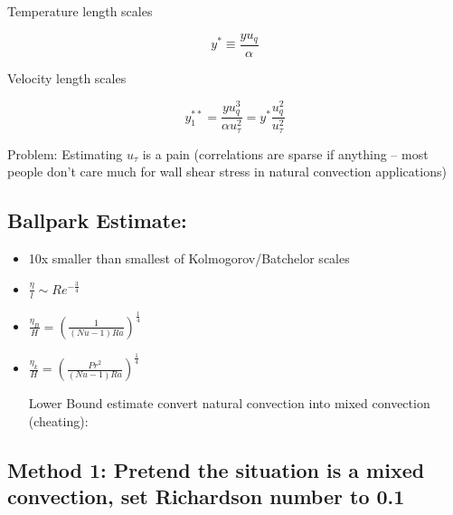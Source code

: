 \documentclass[12pt]{article}
\renewcommand{\_}{\kern-1.5pt\textunderscore\kern-1.5pt}
\begin{document}
Temperature length scales\par

 \[ y^{\ast} \equiv \frac{yu_{q}}{ \alpha } \] \par

Velocity length scales\par

 \[ y_{1}^{\ast\ast}=\frac{yu_{q}^{3}}{ \alpha u_{ \tau}^{2}}=y^{\ast}\frac{u_{q}^{2}}{u_{ \tau}^{2}} \] \par

Problem: Estimating  \( u_{ \tau} \)  is a pain (correlations are sparse if anything – most people don’t care much for wall shear stress in natural convection applications)\par


\vspace{\baselineskip}
\subsection{Ballpark Estimate:}\par

\begin{itemize}
	\item 10x smaller than smallest of Kolmogorov/Batchelor scales\par

	\item  \( \frac{ \eta }{l} \sim Re^{-\frac{3}{4}} \) \par

	\item  \( \frac{ \eta _{B}}{H}= \left( \frac{1}{ \left( Nu-1 \right) Ra} \right) ^{\frac{1}{4}} \) \par

	\item  \( \frac{ \eta _{k}}{H}= \left( \frac{Pr^{2}}{ \left( Nu-1 \right) Ra} \right) ^{\frac{1}{4}} \) \par


\vspace{\baselineskip}
Lower Bound estimate  convert natural convection into mixed convection (cheating):\par
\end{itemize}

\subsection{Method 1: Pretend the situation is a mixed convection, set Richardson number to 0.1} \par
\end{document}
